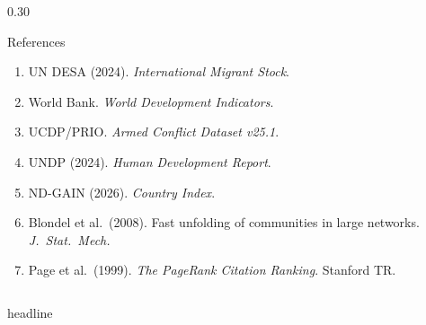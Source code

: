 \documentclass[final]{beamer}
\begin{document}
\begin{frame}[t,fragile]
\begin{columns}[T]
\begin{column}{0.30\textwidth}
  \begin{block}{References}
    \small
    \begin{enumerate}
      \item UN DESA (2024). \textit{International Migrant Stock}.
      \item World Bank. \textit{World Development Indicators}.
      \item UCDP/PRIO. \textit{Armed Conflict Dataset v25.1}.
      \item UNDP (2024). \textit{Human Development Report}.
      \item ND-GAIN (2026). \textit{Country Index}.
      \item Blondel et al.\ (2008). Fast unfolding of communities
            in large networks. \textit{J.\ Stat.\ Mech.}
      \item Page et al.\ (1999). \textit{The PageRank Citation
            Ranking}. Stanford TR.
    \end{enumerate}
  \end{block}

\end{column}

\end{columns}

\vspace{1cm}
\begin{beamercolorbox}[wd=\paperwidth, ht=2cm, dp=0.5cm]{headline}
\end{beamercolorbox}

\end{frame}
\end{document}

